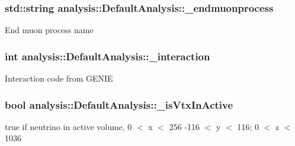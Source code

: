\subsubsection[{\texorpdfstring{\+\_\+endmuonprocess}{_endmuonprocess}}]{\setlength{\rightskip}{0pt plus 5cm}std\+::string analysis\+::\+Default\+Analysis\+::\+\_\+endmuonprocess\hspace{0.3cm}{\ttfamily [private]}}\hypertarget{classanalysis_1_1DefaultAnalysis_a8cbb24a231e167258d2914f92bc4af22}{}\label{classanalysis_1_1DefaultAnalysis_a8cbb24a231e167258d2914f92bc4af22}
End muon process name 
\subsubsection[{\texorpdfstring{\+\_\+interaction}{_interaction}}]{\setlength{\rightskip}{0pt plus 5cm}int analysis\+::\+Default\+Analysis\+::\+\_\+interaction\hspace{0.3cm}{\ttfamily [private]}}\hypertarget{classanalysis_1_1DefaultAnalysis_a35c01b4be6d678e89cada927ab2ba45c}{}\label{classanalysis_1_1DefaultAnalysis_a35c01b4be6d678e89cada927ab2ba45c}
Interaction code from G\+E\+N\+IE 
\subsubsection[{\texorpdfstring{\+\_\+is\+Vtx\+In\+Active}{_isVtxInActive}}]{\setlength{\rightskip}{0pt plus 5cm}bool analysis\+::\+Default\+Analysis\+::\+\_\+is\+Vtx\+In\+Active\hspace{0.3cm}{\ttfamily [private]}}\hypertarget{classanalysis_1_1DefaultAnalysis_a9c03fca7c9d596e0cb490aef4bcd3aed}{}\label{classanalysis_1_1DefaultAnalysis_a9c03fca7c9d596e0cb490aef4bcd3aed}
true if neutrino in active volume, 0 $<$ x $<$ 256 -\/116 $<$ y $<$ 116; 0 $<$ z $<$ 1036 
